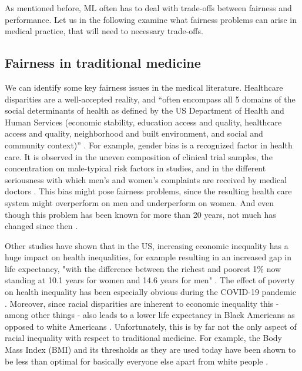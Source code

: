     As mentioned before, ML often has to deal with trade-offs between fairness and performance.
    Let us in the following examine what fairness problems can arise in medical practice, that will need to necessary trade-offs.

\subsection{Fairness in traditional medicine}
\label{fair}
    We can identify some key fairness issues in the medical literature.
    Healthcare disparities are a well-accepted reality, and ``often encompass all 5 domains of the social determinants of health as defined by the US Department of Health and Human Services (economic stability, education access and quality, healthcare access and quality, neighborhood and built environment, and social and community context)'' \cite[p.~2]{Chen2021}.
    For example, gender bias is a recognized factor in health care.
    It is observed \eg in the uneven composition of clinical trial samples, the concentration on male-typical risk factors in studies, and in the different seriousness with which men's and women's complaints are received by medical doctors \cite{Ruiz1997}.
    This bias might pose fairness problems, since the resulting health care system might overperform on men and underperform on women. And even though this problem has been known for more than 20 years, not much has changed since then \cite{nowogrodzki2017inequality}.

    Other studies have shown that in the US, increasing economic inequality has a huge impact on health inequalities, for example resulting in an increased gap in life expectancy, "with the difference between the richest and poorest 1\% now standing at 10.1 years for women and 14.6 years for men" \cite[p.~1431]{dickman2017inequality}. The effect of poverty on health inequality has been especially obvious during the COVID-19 pandemic \cite{patel2020poverty}. Moreover, since racial disparities are inherent to economic inequality this - among other things - also leads to a lower life expectancy in Black Americans as opposed to white Americans \cite{hero2016racial}. Unfortunately, this is by far not the only aspect of racial inequality with respect to traditional medicine. For example, the Body Mass Index (BMI) and its thresholds as they are used today have been shown to be less than optimal for basically everyone else apart from white people \cite{fontaine2003years, moharram2020correlation, hood2019allometric}. 

